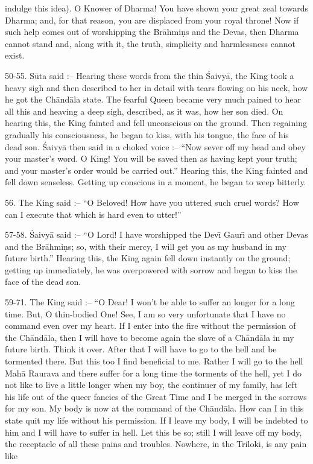 indulge this idea). O Knower of Dharma! You have shown your great zeal towards Dharma; and, for that reason, you are displaced from your royal throne! Now if such help comes out of worshipping the Br\=ahmi\d{n}s and the Devas, then Dharma cannot stand and, along with it, the truth, simplicity and harmlessness cannot exist.

50-55. S\=uta said :-- Hearing these words from the thin \'Saivy\=a, the King took a heavy sigh and then described to her in detail with tears flowing on his neck, how he got the Ch\=and\=ala state. The fearful Queen became very much pained to hear all this and heaving a deep sigh, described, as it was, how her son died. On hearing this, the King fainted and fell unconscious on the ground. Then regaining gradually his consciousness, he began to kiss, with his tongue, the face of his dead son. \'Saivy\=a then said in a choked voice :-- ``Now sever off my head and obey your master's word. O King! You will be saved then as having kept your truth; and your master's order would be carried out.'' Hearing this, the King fainted and fell down senseless. Getting up conscious in a moment, he began to weep bitterly.

56. The King said :-- ``O Beloved! How have you uttered such cruel words? How can I execute that which is hard even to utter!''

57-58. \'Saivy\=a said :-- ``O Lord! I have worshipped the Dev\={\i} Gaur\={\i} and other Devas and the Br\=ahmi\d{n}s; so, with their mercy, I will get you as my husband in my future birth.'' Hearing this, the King again fell down instantly on the ground; getting up immediately, he was overpowered with sorrow and began to kiss the face of the dead son.

59-71. The King said :-- ``O Dear! I won't be able to suffer an longer for a long time. But, O thin-bodied One! See, I am so very unfortunate that I have no command even over my heart. If I enter into the fire without the permission of the Ch\=and\=ala, then I will have to become again the slave of a Ch\=and\=ala in my future birth. Think it over. After that I will have to go to the hell and be tormented there. But this too I find beneficial to me. Rather I will go to the hell Mah\=a Raurava and there suffer for a long time the torments of the hell, yet I do not like to live a little longer when my boy, the continuer of my family, has left his life out of the queer fancies of the Great Time and I be merged in the sorrows for my son. My body is now at the command of the Ch\=and\=ala. How can I in this state quit my life without his permission. If I leave my body, I will be indebted to him and I will have to suffer in hell. Let this be so; still I will leave off my body, the receptacle of all these pains and troubles. Nowhere, in the Triloki, is any pain like


